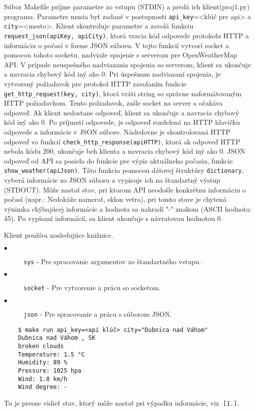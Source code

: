 \documentclass{homework}
\begin{document}
	\maketitle
	\setcounter{questionCounter}{0}
	\renewcommand{\questiontype}{Popis funkcionality}
	\question
		Súbor Makefile príjme parametre zo vstupu (STDIN) a predá ich klient(proj1.py) programu. Parametre musia 		byť zadané v postupnosti \verb|api_key|=<klúč pre api> a \verb|city|=<mesto>. Klient skontroluje 				parametre a zavolá funkciu \verb|request_json(apiKey, apiCity)|, ktorá vracia kód odpovede protokolu HTTP a informáciu o počasí v forme JSON súboru. V tejto funkcií vytvorí socket a pomocou tohoto socketu, nadviaže spojenie s serverom pre 						OpenWeatherMap API. V prípade neuspešného nadviazania spojenia so serverom, klient sa ukončuje 		a navracia chybový kód iný ako 0. Pri úspešnom nadviazaní spojenia, je vytvorený požiadavok pre protokol HTTP zavolaním funkcie \verb|get_http_request(key, city)|, ktorá vráti string so správne naformátovaným HTTP požiadavkom. Tento požiadavok, zašle socket na server a očakáva odpoveď. Ak klient nedostane odpoveď, klient sa ukončuje a navracia chybový kód iný ako 0. Po príjmutí odpovede, je odpoveď rozdelená na HTTP hlavičku odpovede a informácie v JSON súbore. Následovne je skontrolovaná HTTP odpoveď vo funkcií \verb|check_http_response(apiHTTP)|, ktorá ak odpoveď HTTP nebola kódu 200, ukončuje beh klienta a navracia chybový kód iný ako 0. JSON odpoveď od API sa posiela do funkcie pre výpis aktuálneho počasia, funkcie \verb|show_weather(apiJson)|. Táto funkcia pomocou dátovej štruktúry \verb|dictionary|, vyberá informácie zo JSON súboru a vypisuje ich na štandartný výstup (STDOUT). Môže nastať stav, pri ktorom API neodošle konkrétnu informáciu o počasí (napr.: Nedokáže namerať, sklon vetra), pri tomto stave je chytená výnimka chýbajúcej informácie a hodnota sa nahradí "-" znakom (ASCII hodnota: 45). Po vypísaní informácií, sa klient ukončuje s návratovou hodnotou 0.
	
	\renewcommand{\questiontype}{Použité knižnice}
	\question
	Klient používa nasledujúce knižnice.	
	
	\begin{description}
  		\item[$\bullet$] \verb|sys| - Pre spracovanie argumentov zo štandartného vstupu.
  		\item[$\bullet$] \verb|socket| - Pre vytvorenie a prácu so socketom.
  		\item[$\bullet$] \verb|json| - Pre spracovanie a prácu s súborom JSON.
	\end{description}	
	
	\renewcommand{\questiontype}{Príklady spustenia}
	\question
	\begin{verbatim}
	$ make run api_key=<api klúč> city="Dubnica nad Váhom"
	Dubnica nad Váhom , SK
	broken clouds
	Temperature: 1.5 °C
	Humidity: 89 %
	Pressure: 1025 hpa
	Wind: 1.8 km/h
	Wind degree: - 
	\end{verbatim}	
	Tu je presne vidieť stav, ktorý môže nastať pri výpadku informácie, viz. \verb|[1.]|.
\end{document}
